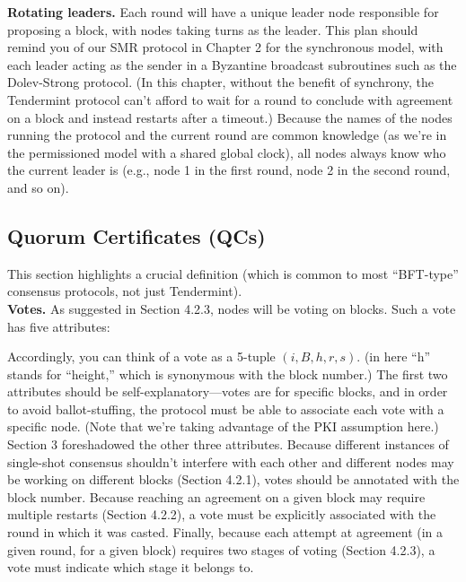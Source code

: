 \noindent
\textbf{Rotating leaders.} 
Each round will have a unique leader node responsible for proposing
a block, with nodes taking turns as the leader. This plan should remind you of our SMR
protocol in Chapter 2 for the synchronous model, with each leader acting as the sender in a
Byzantine broadcast subroutines such as the Dolev-Strong protocol. (In this chapter, without
the benefit of synchrony, the Tendermint protocol can’t afford to wait for a round to conclude
with agreement on a block and instead restarts after a timeout.) Because the names of the
nodes running the protocol and the current round are common knowledge (as we’re in the
permissioned model with a shared global clock), all nodes always know who the current 
leader is (e.g., node 1 in the first round, node 2 in the second round, and so on).


\subsection{Quorum Certificates (QCs)}
This section highlights a crucial definition (which is common to most “BFT-type” consensus
protocols, not just Tendermint).\\
\noindent
\textbf{Votes.} As suggested in Section 4.2.3, nodes will be voting on blocks. Such a vote has five
attributes:

Accordingly, you can think of a vote as a 5-tuple $(i, B, h, r, s)$. (in here “h” stands for “height,”
which is synonymous with the block number.)
The first two attributes should be self-explanatory—votes are for specific blocks, and in order to
avoid ballot-stuffing, the protocol must be able to associate each vote with a specific node.
(Note that we’re taking advantage of the PKI assumption here.) Section 3 foreshadowed the
other three attributes. Because different instances of single-shot consensus shouldn’t interfere
with each other and different nodes may be working on different blocks (Section 4.2.1), votes
should be annotated with the block number. Because reaching an agreement on a given block
may require multiple restarts (Section 4.2.2), a vote must be explicitly associated with the
round in which it was casted. Finally, because each attempt at agreement (in a given round,
for a given block) requires two stages of voting (Section 4.2.3), a vote must indicate which
stage it belongs to.

